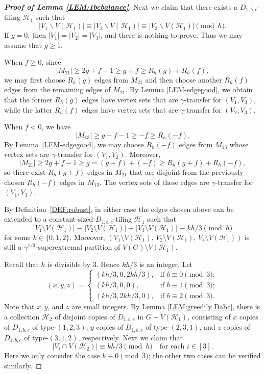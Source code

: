 \documentclass[10pt,a4paper]{amsart}
\begin{document}
\begin{proof}[\textbf{Proof of Lemma \ref{LEM:1bcbalance}}]
Next we claim that there exists a $D_{1,b,c}$-tiling $\mathcal{H}_1$ such that
$$
|V_1\backslash V(\mathcal{H}_1)|\equiv|V_2\backslash V(\mathcal{H}_1)|\equiv|V_3\backslash V(\mathcal{H}_1)|\pmod h.
$$
If $g=0$, then $|V_1|=|V_2|=|V_3|$, and there is nothing to prove. Thus we may assume that $g\geqslant 1$. 

When $f\geqslant 0$, since
$$
|M_{21}|\geqslant 2g+f-1\geqslant g+f\geqslant R_h(g)+R_h(f),
$$
we may first choose $R_h(g)$ edges from $M_{21}$ and then choose another $R_h(f)$ edges from the remaining edges of $M_{21}$. By Lemma \ref{LEM-edgegood}, we obtain that the former $R_h(g)$ edges have vertex sets that are $\gamma$-transfer for $(V_1,V_3)$, while the latter $R_h(f)$ edges have vertex sets that are $\gamma$-transfer for $(V_2,V_3)$.

When $f<0$, we have
$$
|M_{13}|\geqslant g-f-1\geqslant -f\geqslant R_h(-f).
$$
By Lemma~\ref{LEM-edgegood}, we may choose $R_h(-f)$ edges from $M_{13}$ whose vertex sets are $\gamma$-transfer for $(V_1,V_2)$. Moreover,
$$
|M_{21}|\geqslant 2g+f-1\geqslant g=(g+f)+(-f)\geqslant R_h(g+f)+R_h(-f),
$$
so there exist $R_h(g+f)$ edges in $M_{21}$ that are disjoint from the previously chosen $R_h(-f)$ edges in $M_{13}$. The vertex sets of these edges are $\gamma$-transfer for $(V_1,V_3)$.

By Definition~\ref{DEF:robust}, in either case the edges chosen above can be extended to a constant-sized $D_{1,b,c}$-tiling $\mathcal H_1$ such that
$$
|V_1\setminus V(\mathcal H_1)|\equiv |V_2\setminus V(\mathcal H_1)|\equiv |V_3\setminus V(\mathcal H_1)|\equiv kh/3 \pmod h
$$
for some $k\in\{0,1,2\}$. Moreover, $
(V_1\setminus V(\mathcal H_1),\,V_2\setminus V(\mathcal H_1),\,V_3\setminus V(\mathcal H_1))
$
is still a $\gamma^{1/3}$-superextremal partition of $V(G)\setminus V(\mathcal H_1)$.

Recall that $h$ is divisible by $3$. Hence $kh/3$ is an integer. Let
\begin{equation*}
(x,y,z) = \begin{cases}
(kh/3, 0, 2kh/3), & \mbox{if } b\equiv0\pmod{3}; \\
(kh/3, 0, 0), & \mbox{if } b\equiv1\pmod{3}; \\
(kh/3, 2kh/3, 0), & \mbox{if } b\equiv2\pmod{3}.
\end{cases}
\end{equation*}
Note that $x,y$, and $z$ are small integers. By Lemma \ref{LEM:greedily Dabc}, there is a collection $\mathcal{H}_2$ of disjoint copies of $D_{1,b,c}$ in $G- V(\mathcal{H}_1)$, consisting of $x$ copies of $D_{1,b,c}$ of type-$(1,2,3)$, $y$ copies of $D_{1,b,c}$ of type-$(2,3,1)$, and $z$ copies of $D_{1,b,c}$ of type-$(3,1,2)$, respectively. Next we claim that
$$
|V_i\cap V(\mathcal{H}_2)| \equiv kh/3\pmod h
\quad\text{for each } i\in[3].
$$
Here we only consider the case $b\equiv0\pmod{3}$; the other two cases can be verified similarly. 


\end{proof}
\end{document}
